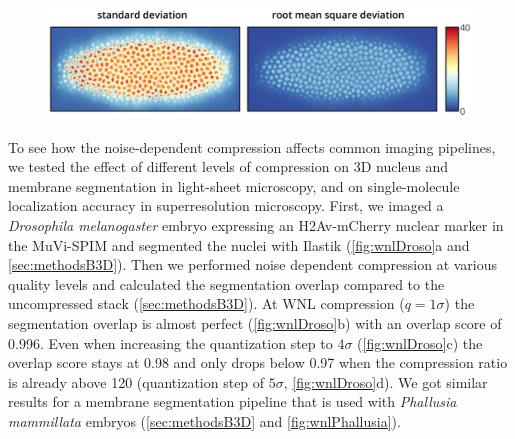     \begin{figure}[tpb]
      \centering
      \includegraphics[page=1,width=1\textwidth]{SFig4_RMSDvsSD_rotated}
      \label{fig:RMSD}
    \end{figure}

    To see how the noise-dependent compression affects common imaging pipelines, we tested the effect of different levels of compression on 3D nucleus and membrane segmentation in light-sheet microscopy, and on single-molecule localization accuracy in superresolution microscopy.
    First, we imaged a \textit{Drosophila melanogaster} embryo expressing an H2Av-mCherry nuclear marker in the MuVi-SPIM and segmented the nuclei with Ilastik \cite{sommer_ilastik:_2011} (\autoref{fig:wnlDroso}a and \autoref{sec:methodsB3D}). Then we performed noise dependent compression at various quality levels and calculated the segmentation overlap compared to the uncompressed stack (\autoref{sec:methodsB3D}). At WNL compression ($q=1 \sigma$) the segmentation overlap is almost perfect (\autoref{fig:wnlDroso}b) with an overlap score of 0.996. Even when increasing the quantization step to $4\sigma$ (\autoref{fig:wnlDroso}c) the overlap score stays at 0.98 and only drops below 0.97 when the compression ratio is already above 120 (quantization step of $5\sigma$, \autoref{fig:wnlDroso}d).
    We got similar results for a membrane segmentation pipeline that is used with \textit{Phallusia mammillata} embryos (\autoref{sec:methodsB3D} and \autoref{fig:wnlPhallusia}).

